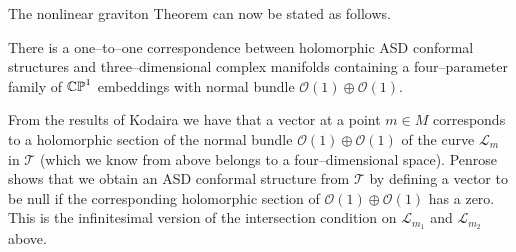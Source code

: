 

The nonlinear graviton Theorem can now be stated as follows.
\begin{theo}
There is a one--to--one correspondence between holomorphic ASD conformal structures and three--dimensional complex manifolds containing a four--parameter family of $\mathbb{CP}^1$ embeddings with normal bundle $\mathcal{O}(1)\oplus\mathcal{O}(1)$.
\end{theo}
\noindent
From the results of Kodaira \cite{Kodaira} we have that a vector at a point $m\in M$ corresponds to a holomorphic section of the normal bundle $\mathcal{O}(1)\oplus\mathcal{O}(1)$ of the curve $\mathscr{L}_m$ in $\mathscr{T}$ (which we know from above belongs to a four--dimensional space). Penrose shows that we obtain an ASD conformal structure from $\mathscr{T}$ by defining a vector to be null if the corresponding holomorphic section of $\mathcal{O}(1)\oplus\mathcal{O}(1)$ has a zero. This is the infinitesimal version of the intersection condition on $\mathscr{L}_{m_1}$ and $\mathscr{L}_{m_2}$ above. %


